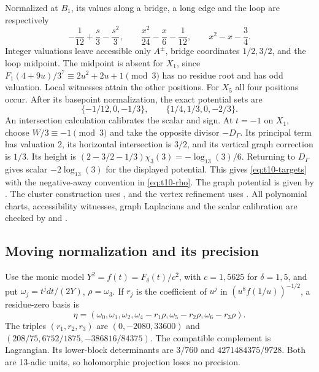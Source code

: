 Normalized at $B_1$, its values along a bridge, a long edge and the
loop are respectively
\[
 -\frac1{12}+\frac s3-\frac{s^2}3,\qquad
 \frac{x^2}{24}-\frac x6-\frac1{12},\qquad
 x^2-x-\frac34.
\]
Integer valuations leave accessible only $A^\pm$, bridge coordinates
$1/2,3/2$, and the loop midpoint. The midpoint is absent for $X_1$,
since $F_1(4+9u)/3^7\equiv2u^2+2u+1\pmod3$ has no residue root
and has odd valuation. Local witnesses attain the other positions.
For $X_5$ all four positions occur. After its basepoint normalization,
the exact potential sets are
\[
 \{-1/12,0,-1/3\},\qquad \{1/4,1/3,0,-2/3\}.
\]
An intersection calculation calibrates the scalar and sign. At $t=-1$
on $X_1$, choose $W/3\equiv-1\pmod3$ and take the opposite divisor
$-D_\Gamma$. Its principal term has valuation 2, its horizontal
intersection is $3/2$, and its vertical graph correction is $1/3$.
Its height is $(2-3/2-1/3)\chi_3(3)=-\log_{13}(3)/6$.
Returning to $D_\Gamma$ gives scalar $-2\log_{13}(3)$ for the
displayed potential. This gives \eqref{eq:t10-targets} with the
negative-away convention in \eqref{eq:t10-rho}.
The graph potential is given by \cite[Theorem~3.2]{BDMTV}. The
cluster construction uses \cite[Theorems~7.1 and~8.6]{DDMM}, and the
vertex refinement uses \cite[Proposition~3.13(3)]{BPR}. All polynomial charts, accessibility witnesses, graph
Laplacians and the scalar calibration are checked by
 and
.

\subsection{Moving normalization and its precision}

Use the monic model $Y^2=f(t)=F_\delta(t)/c^2$, with $c=1,5625$
for $\delta=1,5$, and put $\omega_j=t^jdt/(2Y)$, $\rho=\omega_3$.
If $r_j$ is the coefficient of $u^j$ in
$(u^8f(1/u))^{-1/2}$, a residue-zero basis is
\[
 \eta=(\omega_0,\omega_1,\omega_2,
             \omega_4-r_1\rho,\omega_5-r_2\rho,\omega_6-r_3\rho).
\]
The triples $(r_1,r_2,r_3)$ are $(0,-2080,33600)$ and
$(208/75,6752/1875,-386816/84375)$. The compatible complement is Lagrangian. Its lower-block determinants
are $3/760$ and $4271484375/9728$. Both are 13-adic units, so holomorphic projection
loses no precision.

